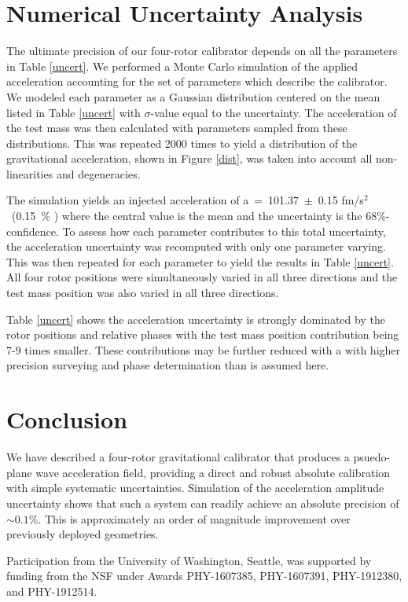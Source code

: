 \documentclass[superscriptaddress, twocolumn, prd]{revtex4-1}
\begin{document}
\section{Numerical Uncertainty Analysis}

The ultimate precision of our four-rotor calibrator depends on all the parameters in Table \ref{uncert}. We performed a Monte Carlo simulation of the applied acceleration accounting for the set of parameters which describe the calibrator. We modeled each parameter as a Gaussian distribution centered on the mean listed in Table \ref{uncert} with $\sigma$-value equal to the uncertainty. The acceleration of the test mass was then calculated with parameters sampled from these distributions. This was repeated 2000 times to yield a distribution of the gravitational acceleration, shown in Figure \ref{dist}, was taken into account all non-linearities and degeneracies. 


The simulation yields an injected acceleration of a~=~101.37~$\pm$~0.15 fm/s$^2$~(0.15~\% ) where the central value is the mean and the uncertainty is the 68\%-confidence. To assess how each parameter contributes to this total uncertainty, the acceleration uncertainty was recomputed with only one parameter varying. This was then repeated for each parameter to yield the results in Table \ref{uncert}. All four rotor positions were simultaneously varied  in all three directions and the test mass position was also varied in all three directions.

Table \ref{uncert} shows the acceleration uncertainty is strongly dominated by the rotor positions and relative phases with the test mass position contribution being 7-9 times smaller. These contributions may be further reduced with a  with higher precision surveying and phase determination than is assumed here.
\\
\section{Conclusion} 
\quad We have described a four-rotor gravitational calibrator that produces a psuedo-plane wave acceleration field, providing a direct and robust absolute calibration with simple systematic uncertainties. Simulation of the acceleration amplitude uncertainty shows that such a system can readily achieve an absolute precision of $\sim0.1\%$. This is approximately an order of magnitude improvement over previously deployed geometries. \cite{ncal} 

\begin{acknowledgements}

Participation from the University of Washington, Seattle, was supported by funding from the NSF under Awards PHY-1607385, PHY-1607391, PHY-1912380, and PHY-1912514.

\end{acknowledgements}


 

\end{document}
